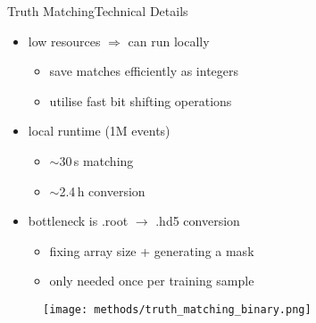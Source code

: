 \documentclass[9pt, aspectratio=169]{beamer}
\begin{document}
\begin{frame}{Truth Matching}{Technical Details}
	\begin{minipage}{.69\textwidth}
		\begin{itemize}
			\item low resources $\Rightarrow$ can run locally
			\begin{itemize}
				\item save matches efficiently as integers 
				\item utilise fast bit shifting operations
			\end{itemize}
			\item local runtime (1M events) 
			\begin{itemize}
				\item $\sim$30\,s matching
				\item $\sim$2.4\,h conversion
			\end{itemize}
			\item bottleneck is .root $\rightarrow$ .hd5 conversion
			\begin{itemize}
				\item fixing array size + generating a mask
				\item only needed once per training sample
			\end{itemize}
		\end{itemize}
	\end{minipage}\hfill
	\begin{minipage}{.3\textwidth}
		\begin{figure}
			\centering
			\texttt{[image: methods/truth\_matching\_binary.png]}
		\end{figure}
	\end{minipage}
\end{frame}
\end{document}
